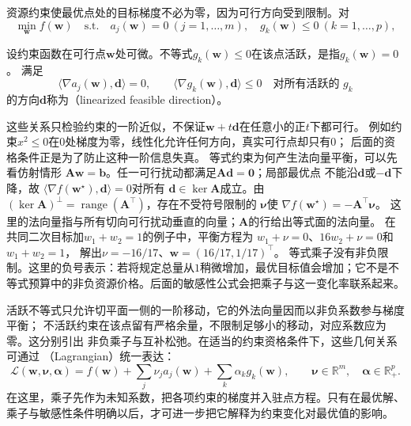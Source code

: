 资源约束使最优点处的目标梯度不必为零，因为可行方向受到限制。对
\[
  \min_{\bm{w}}f(\bm{w})
  \quad\text{s.t.}\quad
  a_j(\bm{w})=0\ (j=1,\ldots,m),\quad
  g_k(\bm{w})\leq0\ (k=1,\ldots,p),
\]
\begin{definition}[活跃约束与线性化可行方向]
\label{def:opt-linearized-feasible-direction}
设约束函数在可行点$\bm w$处可微。不等式$g_k(\bm w)\leq0$在该点活跃，是指$g_k(\bm w)=0$。
满足
\[
  \langle\nabla a_j(\bm{w}),\bm{d}\rangle=0,\qquad
  \langle\nabla g_k(\bm{w}),\bm{d}\rangle\leq0
  \quad\text{对所有活跃的 }g_k
\]
的方向$\bm{d}$称为（linearized feasible direction）。
\end{definition}
这些关系只检验约束的一阶近似，不保证$\bm w+t\bm d$在任意小的正$t$下都可行。
例如约束$x^2\leq0$在$0$处梯度为零，线性化允许任何方向，真实可行点却只有$0$；
后面的资格条件正是为了防止这种一阶信息失真。
等式约束为何产生法向量平衡，可以先看仿射情形
$\bm{A}\bm{w}=\bm{b}$。任一可行扰动都满足$\bm{A}\bm{d}=\bm{0}$；局部最优点
不能沿$\bm{d}$或$-\bm{d}$下降，故
$\langle\nabla f(\bm{w}^{\star}),\bm{d}\rangle=0$对所有
$\bm{d}\in\ker\bm{A}$成立。由
$(\ker\bm{A})^\perp=\operatorname{range}(\bm{A}^{\top})$，存在不受符号限制的
$\bm{\nu}$使
$\nabla f(\bm{w}^{\star})=-\bm{A}^{\top}\bm{\nu}$。
这里的法向量指与所有切向可行扰动垂直的向量；$\bm A$的行给出等式面的法向量。
在共同二次目标加$w_1+w_2=1$的例子中，平衡方程为
$w_1+\nu=0$、$16w_2+\nu=0$和$w_1+w_2=1$，
解出$\nu=-16/17$、$\bm w=(16/17,1/17)^\top$。
等式乘子没有非负限制。这里的负号表示：若将规定总量从$1$稍微增加，最优目标值会增加；它不是不等式预算中的非负资源价格。后面的敏感性公式会把乘子与这一变化率联系起来。

活跃不等式只允许切平面一侧的一阶移动，它的外法向量因而以非负系数参与梯度平衡；
不活跃约束在该点留有严格余量，不限制足够小的移动，对应系数应为零。这分别引出
非负乘子与互补松弛。在适当的约束资格条件下，这些几何关系可通过
（Lagrangian）统一表达：
\[
  \mathcal{L}(\bm{w},\bm{\nu},\bm{\alpha})
  =f(\bm{w})+\sum_j\nu_j a_j(\bm{w})
  +\sum_k\alpha_k g_k(\bm{w}),
  \qquad
  \bm{\nu}\in\mathbb{R}^m,\quad
  \bm{\alpha}\in\mathbb{R}_+^p.
\]
在这里，乘子先作为未知系数，把各项约束的梯度并入驻点方程。只有在最优解、乘子与敏感性条件明确以后，才可进一步把它解释为约束变化对最优值的影响。

